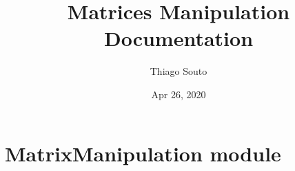 \documentclass[letterpaper,10pt,english,openany,oneside]{sphinxmanual}
\title{Matrices Manipulation Documentation}
\date{Apr 26, 2020}
\author{Thiago Souto}
\begin{document}
\maketitle
\sphinxtableofcontents
{}\label{\detokenize{index::doc}}



\chapter{MatrixManipulation module}
\label{\detokenize{MatrixManipulation:welcome-to-matrices-manipulation-s-documentation}}\label{\detokenize{MatrixManipulation:matrixmanipulation-module}}\label{\detokenize{MatrixManipulation:module-MatrixManipulation}}\label{\detokenize{MatrixManipulation::doc}}
\end{document}
